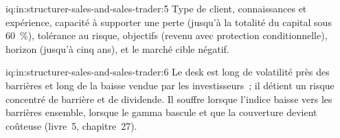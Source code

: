 \begin{solution}{iq:in:structurer-sales-and-sales-trader:5}
Type de client, connaissances et expérience, capacité à supporter une perte (jusqu'à la totalité du capital sous 60~\%), tolérance au risque,
objectifs (revenu avec protection conditionnelle), horizon (jusqu'à cinq ans), et le marché cible négatif.
\end{solution}

\begin{solution}{iq:in:structurer-sales-and-sales-trader:6}
Le desk est long de volatilité près des barrières et long de la baisse vendue par les investisseurs~; il détient un risque concentré de barrière
et de dividende. Il souffre lorsque l'indice baisse vers les barrières ensemble, lorsque le gamma bascule et que la couverture devient
coûteuse (livre~5, chapitre~27).
\end{solution}
